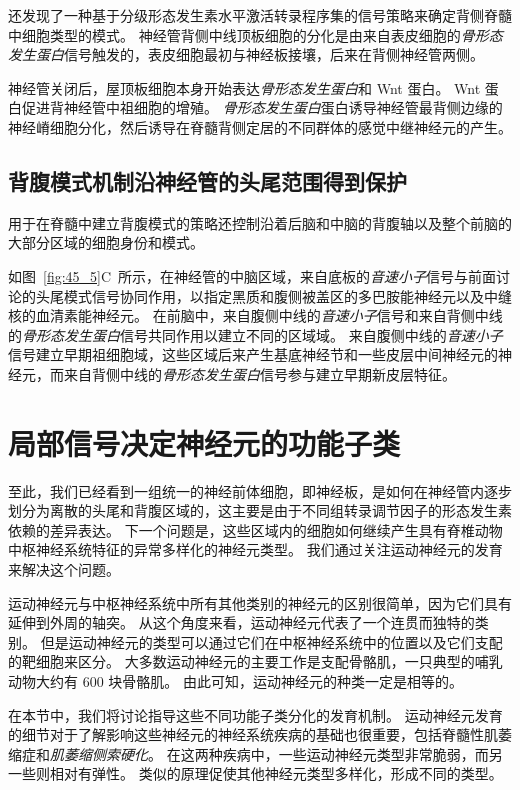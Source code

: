 还发现了一种基于分级形态发生素水平激活转录程序集的信号策略来确定背侧脊髓中细胞类型的模式。
神经管背侧中线顶板细胞的分化是由来自表皮细胞的\textit{骨形态发生蛋白}信号触发的，表皮细胞最初与神经板接壤，后来在背侧神经管两侧。


神经管关闭后，屋顶板细胞本身开始表达\textit{骨形态发生蛋白}和 Wnt 蛋白。
Wnt 蛋白促进背神经管中祖细胞的增殖。
\textit{骨形态发生蛋白}蛋白诱导神经管最背侧边缘的神经嵴细胞分化，然后诱导在脊髓背侧定居的不同群体的感觉中继神经元的产生。



\subsection{背腹模式机制沿神经管的头尾范围得到保护}

用于在脊髓中建立背腹模式的策略还控制沿着后脑和中脑的背腹轴以及整个前脑的大部分区域的细胞身份和模式。


如图~\ref{fig:45_5}C~所示，在神经管的中脑区域，来自底板的\textit{音速小子}信号与前面讨论的头尾模式信号协同作用，以指定黑质和腹侧被盖区的多巴胺能神经元以及中缝核的血清素能神经元。
在前脑中，来自腹侧中线的\textit{音速小子}信号和来自背侧中线的\textit{骨形态发生蛋白}信号共同作用以建立不同的区域域。
来自腹侧中线的\textit{音速小子}信号建立早期祖细胞域，这些区域后来产生基底神经节和一些皮层中间神经元的神经元，而来自背侧中线的\textit{骨形态发生蛋白}信号参与建立早期新皮层特征。



\section{局部信号决定神经元的功能子类}

至此，我们已经看到一组统一的神经前体细胞，即神经板，是如何在神经管内逐步划分为离散的头尾和背腹区域的，这主要是由于不同组转录调节因子的形态发生素依赖的差异表达。
下一个问题是，这些区域内的细胞如何继续产生具有脊椎动物中枢神经系统特征的异常多样化的神经元类型。
我们通过关注运动神经元的发育来解决这个问题。


运动神经元与中枢神经系统中所有其他类别的神经元的区别很简单，因为它们具有延伸到外周的轴突。
从这个角度来看，运动神经元代表了一个连贯而独特的类别。
但是运动神经元的类型可以通过它们在中枢神经系统中的位置以及它们支配的靶细胞来区分。
大多数运动神经元的主要工作是支配骨骼肌，一只典型的哺乳动物大约有 600 块骨骼肌。
由此可知，运动神经元的种类一定是相等的。


在本节中，我们将讨论指导这些不同功能子类分化的发育机制。
运动神经元发育的细节对于了解影响这些神经元的神经系统疾病的基础也很重要，包括脊髓性肌萎缩症和\textit{肌萎缩侧索硬化}。
在这两种疾病中，一些运动神经元类型非常脆弱，而另一些则相对有弹性。
类似的原理促使其他神经元类型多样化，形成不同的类型。



